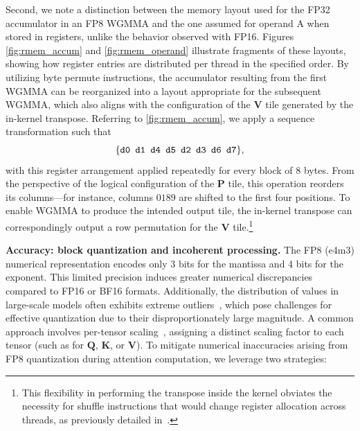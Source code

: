 Second, we note a distinction between the memory layout used for the FP32 accumulator in an FP8 WGMMA and the one assumed for operand A when stored in registers, unlike the behavior observed with FP16. Figures \cref{fig:rmem_accum} and \cref{fig:rmem_operand} illustrate fragments of these layouts, showing how register entries are distributed per thread in the specified order. By utilizing byte permute instructions, the accumulator resulting from the first WGMMA can be reorganized into a layout appropriate for the subsequent WGMMA, which also aligns with the configuration of the $\mathbf{V}$ tile generated by the in-kernel transpose. Referring to \cref{fig:rmem_accum}, we apply a sequence transformation such that
$$\{ \verb|d0 d1 d4 d5 d2 d3 d6 d7| \},$$
with this register arrangement applied repeatedly for every block of 8 bytes. From the perspective of the logical configuration of the $\mathbf{P}$ tile, this operation reorders its columns—for instance, columns $0189$ are shifted to the first four positions. To enable WGMMA to produce the intended output tile, the in-kernel transpose can correspondingly output a row permutation for the $\mathbf{V}$ tile.\footnote{This flexibility in performing the transpose inside the kernel obviates the necessity for shuffle instructions that would change register allocation across threads, as previously detailed in~\citep{colfax_fp8_flashattention_2024}.}

\textbf{Accuracy: block quantization and incoherent processing.} The FP8 (e4m3) numerical representation encodes only 3 bits for the mantissa and 4 bits for the exponent. This limited precision induces greater numerical discrepancies compared to FP16 or BF16 formats. Additionally, the distribution of values in large-scale models often exhibits extreme outliers~\citep{dettmers2208llm,
  sun2024massive}, which pose challenges for effective quantization due to their disproportionately large magnitude. A common approach involves per-tensor scaling~\citep{micikevicius2022fp8}, assigning a distinct scaling factor to each tensor (such as for $\mathbf{Q}$, $\mathbf{K}$, or $\mathbf{V}$).
To mitigate numerical inaccuracies arising from FP8 quantization during attention computation, we leverage two strategies:

